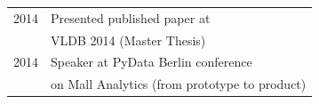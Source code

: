 \documentclass[10pt]{article} %
\begin{document}
\begin{minipage}[t]{0.44\textwidth}
\begin{tabular}{rl}
\textsc{2014}
& Presented published paper at \\
& VLDB 2014 (Master Thesis) \\
\textsc{2014}
& Speaker at PyData Berlin conference \\
& on Mall Analytics (from prototype to product) \\ 





\end{tabular}\\[10pt]

	
\end{minipage} %
\end{document}
